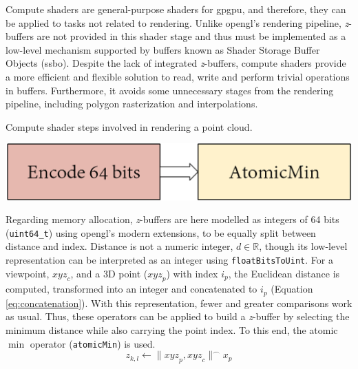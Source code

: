 Compute shaders are general-purpose shaders for \acrshort{gpgpu}, and therefore, they can be applied to tasks not related to rendering. Unlike \acrshort{opengl}'s rendering pipeline, \textit{z}-buffers are not provided in this shader stage and thus must be implemented as a low-level mechanism supported by buffers known as Shader Storage Buffer Objects (\acrshort{ssbo}). Despite the lack of integrated \textit{z}-buffers, compute shaders provide a more efficient and flexible solution to read, write and perform trivial operations in buffers. Furthermore, it avoids some unnecessary stages from the rendering pipeline, including polygon rasterization and interpolations. 

\begin{marginfigure}[.cm]
    \caption{Compute shader steps involved in rendering a point cloud.}
    \label{fig:occlusion_compute_shader_zbuffer_core}
    \includegraphics[width=\linewidth]{figs/multi_thermal_projection/occlusion_compute_shader_core.png}
\end{marginfigure}
Regarding memory allocation, \textit{z}-buffers are here modelled as integers of 64 bits (\verb|uint64_t|) using \acrshort{opengl}'s modern extensions, to be equally split between distance and index. Distance is not a numeric integer, $d \in \mathbb{R}$, though its low-level representation can be interpreted as an integer using \verb|floatBitsToUint|. For a viewpoint, $\textit{xyz}_c$, and a 3D point ($\textit{xyz}_p$) with index $i_p$, the Euclidean distance is computed, transformed into an integer and concatenated to $i_p$ (Equation \ref{eq:concatenation}). With this representation, fewer and greater comparisons work as usual. Thus, these operators can be applied to build a \textit{z}-buffer by selecting the minimum distance while also carrying the point index. To this end, the atomic $\min$ operator (\verb|atomicMin|) is used.
\begin{equation}
    \label{eq:concatenation}
    z_{k, l} \gets \lVert\textit{xyz}_p, \textit{xyz}_c\rVert ^\frown x_p
\end{equation}

